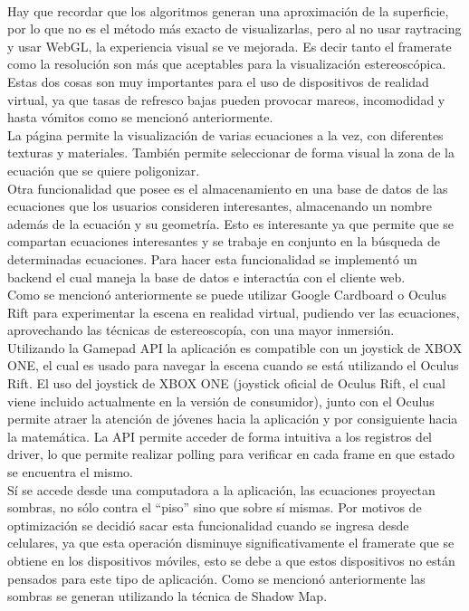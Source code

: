 \documentclass[12pt]{article}
\begin{document}
\\Hay que recordar que los algoritmos generan una aproximación de la superficie, por lo que no es el método más exacto de visualizarlas, pero al no usar raytracing y usar WebGL, la experiencia visual se ve mejorada. Es decir tanto el framerate como la resolución son más que aceptables para la visualización estereoscópica. Estas dos cosas son muy importantes para el uso de dispositivos de realidad virtual, ya que tasas de refresco bajas pueden provocar mareos, incomodidad y hasta vómitos como se mencionó anteriormente.
\\La página permite la visualización de varias ecuaciones a la vez, con diferentes texturas y materiales. También permite seleccionar de forma visual la zona de la ecuación que se quiere poligonizar.
\\Otra funcionalidad que posee es el almacenamiento en una base de datos de las ecuaciones que los usuarios consideren interesantes, almacenando un nombre además de la ecuación y su geometría. Esto es interesante ya que permite que se compartan ecuaciones interesantes y se trabaje en conjunto en la búsqueda de determinadas ecuaciones. Para hacer esta funcionalidad se implementó un backend el cual maneja la base de datos e interactúa con el cliente web.
\\Como se mencionó anteriormente se puede utilizar Google Cardboard o Oculus Rift para experimentar la escena en realidad virtual, pudiendo ver las ecuaciones, aprovechando las técnicas de estereoscopía, con una mayor inmersión.
\\Utilizando la Gamepad API\cite{gamepadapi} la aplicación es compatible con un joystick de XBOX ONE, el cual es usado para navegar la escena cuando se está utilizando el Oculus Rift. El uso del joystick de XBOX ONE (joystick oficial de Oculus Rift, el cual viene incluido actualmente en la versión de consumidor), junto con el Oculus permite atraer la atención de jóvenes hacia la aplicación y por consiguiente hacia la matemática. La API permite acceder de forma intuitiva a los registros del driver\cite{engine}, lo que permite realizar polling para verificar en cada frame en que estado se encuentra el mismo.
\\Sí se accede desde una computadora a la aplicación, las ecuaciones proyectan sombras, no sólo contra el “piso” sino que sobre sí mismas. Por motivos de optimización se decidió sacar esta funcionalidad cuando se ingresa desde celulares, ya que esta operación disminuye significativamente el framerate que se obtiene en los dispositivos móviles, esto se debe a que estos dispositivos no están pensados para este tipo de aplicación. Como se mencionó anteriormente las sombras se generan utilizando la técnica de Shadow Map\cite{shadowmap}\cite{realtimerendering}.
\end{document}
